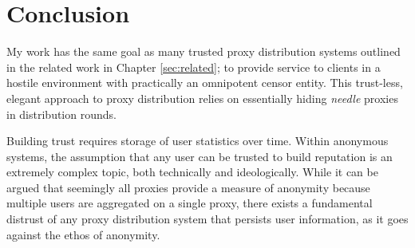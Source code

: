 \chapter{Conclusion}
\label{sec:conclusion}

My work has the same goal as many trusted proxy distribution systems outlined in the related work in Chapter \ref{sec:related}; to provide service to clients in a hostile environment with practically an omnipotent censor entity. This trust-less, elegant approach to proxy distribution relies on essentially hiding \textit{needle} proxies in distribution rounds.

Building trust requires storage of user statistics over time. Within anonymous systems, the assumption that any user can be trusted to build reputation is an extremely complex topic, both technically and ideologically. While it can be argued that seemingly all proxies provide a measure of anonymity because multiple users are aggregated on a single proxy, there exists a fundamental distrust of any proxy distribution system that persists user information, as it goes against the ethos of anonymity. 

